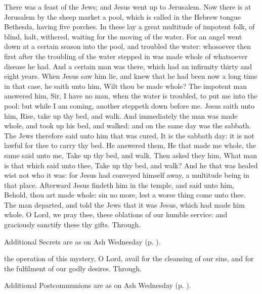  There was a feast of the Jews; and Jesus went up to Jerusalem. Now there is at Jerusalem by the sheep market a pool, which is called in the Hebrew tongue Bethesda, having five porches. In these lay a great multitude of impotent folk, of blind, halt, withered, waiting for the moving of the water. For an angel went down at a certain season into the pool, and troubled the water: whosoever then first after the troubling of the water stepped in was made whole of whatsoever disease he had. And a certain man was there, which had an infirmity thirty and eight years. When Jesus saw him lie, and knew that he had been now a long time in that case, he saith unto him, Wilt thou be made whole? The impotent man answered him, Sir, I have no man, when the water is troubled, to put me into the pool: but while I am coming, another steppeth down before me. Jesus saith unto him, Rise, take up thy bed, and walk. And immediately the man was made whole, and took up his bed, and walked: and on the same day was the sabbath. The Jews therefore said unto him that was cured, It is the sabbath day: it is not lawful for thee to carry thy bed. He answered them, He that made me whole, the same said unto me, Take up thy bed, and walk. Then asked they him, What man is that which said unto thee, Take up thy bed, and walk? And he that was healed wist not who it was: for Jesus had conveyed himself away, a multitude being in that place. Afterward Jesus findeth him in the temple, and said unto him, Behold, thou art made whole: sin no more, lest a worse thing come unto thee. The man departed, and told the Jews that it was Jesus, which had made him whole.
\secret
{} O Lord, we pray thee, these oblations of our humble service: and graciously sanctify these thy gifts. Through.
\begin{rubric}
    Additional Secrets are as on Ash Wednesday (p. \pageref{AshWednesdayMassSecret}).
\end{rubric}
\postcommunion
{} the operation of this mystery, O Lord, avail for the cleansing of our sins, and for the fulfilment of our godly desires. Through.\\
\begin{rubric}
    Additional Postcommunions are as on Ash Wednesday (p. \pageref{AshWednesdayMassPostcommunion}).
\end{rubric}

